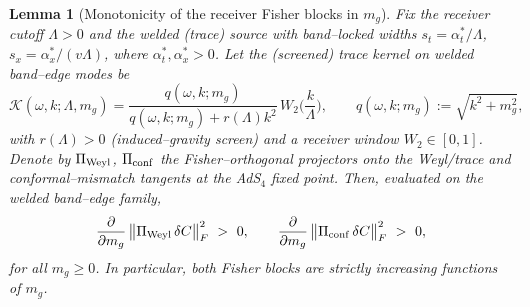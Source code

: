 \documentclass[10pt]{article}
\theoremstyle{definition}
\theoremstyle{plain}
\newtheorem{lemma}{Lemma}[section]
\begin{document}
\begin{lemma}[Monotonicity of the receiver Fisher blocks in $m_g$]\label{lem:monotone-mg}
Fix the receiver cutoff $\Lambda>0$ and the welded (trace) source with band–locked widths
$s_t=\alpha_t^{*}/\Lambda$, $s_x=\alpha_x^{*}/(v\Lambda)$, where $\alpha_t^{*},\alpha_x^{*}>0$.
Let the (screened) trace kernel on welded band–edge modes be
\[
\mathcal K(\omega,k;\Lambda,m_g)
=\frac{q(\omega,k;m_g)}{q(\omega,k;m_g)+r(\Lambda)k^2}\,W_2\!\Big(\frac{k}{\Lambda}\Big),
\qquad
q(\omega,k;m_g):=\sqrt{k^2+m_g^2},
\]
with $r(\Lambda)>0$ (induced–gravity screen) and a receiver window $W_2\in[0,1]$. Denote by
$\Pi_{\rm Weyl}$, $\Pi_{\rm conf}$ the Fisher–orthogonal projectors onto the Weyl/trace and conformal–mismatch
tangents at the AdS$_4$ fixed point. Then, evaluated on the welded band–edge family,
\[
\frac{\partial}{\partial m_g}\,\big\|\Pi_{\rm Weyl}\,\delta C\big\|_{F}^2\ >\ 0,
\qquad
\frac{\partial}{\partial m_g}\,\big\|\Pi_{\rm conf}\,\delta C\big\|_{F}^2\ >\ 0,
\]
for all $m_g\ge 0$. In particular, both Fisher blocks are strictly increasing functions of $m_g$.
\end{lemma}
\end{document}
